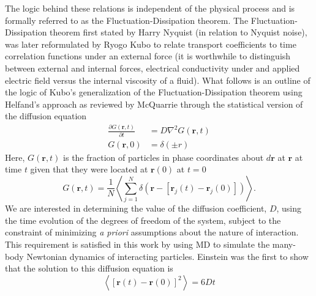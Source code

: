 The logic behind these relations is independent of the physical process and is formally referred to as the Fluctuation-Dissipation theorem. The Fluctuation-Dissipation theorem first stated by Harry Nyquist (in relation to Nyquist noise), was later reformulated by Ryogo Kubo to relate transport coefficients to time correlation functions \cite{JPSJ.12.570} under an external force (it is worthwhile to distinguish between external and internal forces, electrical conductivity under and applied electric field versus the internal viscosity of a fluid)\cite{zwanzig1965time}. What follows is an outline of the logic of Kubo's generalization of the Fluctuation-Dissipation theorem using Helfand's approach as reviewed by McQuarrie \cite{mcquarrie2000statistical} through the statistical version of the diffusion equation
%
\begin{equation}
\begin{split}
	\frac{\partial G(\bm{r},t)}{\partial t}&= D \nabla ^2G(\bm{r},t)\\
G(\bm{r},0)&=\delta(\pm{r})
\end{split}
\end{equation}
%
Here, $G(\bm{r},t)$ is the fraction of particles in phase coordinates about $d\bm{r}$ at $\bm{r}$ at time $t$ given that they were located at $\bm{r}(0)$ at $t=0$
%
\begin{equation}
G(\bm{r},t)= \frac{1}{N}\left<\sum_{j=1}^N\delta(\bm{r}-[\bm{r}_j(t)-\bm{r}_j(0)])\right>.
\end{equation}
%
We are interested in determining the value of the diffusion coefficient, $D$, using the time evolution of the degrees of freedom of the system, subject to the constraint of minimizing \textit{a priori} assumptions about the nature of interaction. This requirement is satisfied in this work by using MD to simulate the many-body Newtonian dynamics of interacting particles. Einstein was the first to show that the solution to this diffusion equation is \cite{einstein1905brownian}
%
\begin{equation} \label{EQ:Einstein}
\left<[\bm{r}(t)-\bm{r}(0)]^2\right>=6Dt
\end{equation}
%
%
